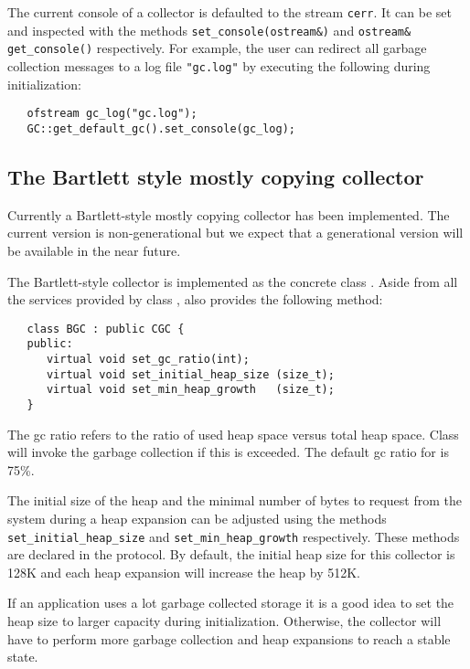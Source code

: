    The current console of a collector is defaulted to the \Cpp{} stream
\verb|cerr|.  It can be set and inspected with the methods
\verb|set_console(ostream&)| and \verb|ostream& get_console()| respectively.
For example, the user can redirect all garbage collection messages
to a log file \verb|"gc.log"| by executing the following during initialization:

\begin{verbatim}
   ofstream gc_log("gc.log");
   GC::get_default_gc().set_console(gc_log); 
\end{verbatim}

\subsection{The Bartlett style mostly copying collector}

   Currently a Bartlett-style mostly copying collector has been implemented.
The current version is non-generational but we expect that a generational
version will be available in the near future.

   The Bartlett-style collector is implemented as the concrete class
.  Aside from all the services provided by class ,
 also provides the following method:

\begin{verbatim}
   class BGC : public CGC {
   public:
      virtual void set_gc_ratio(int);
      virtual void set_initial_heap_size (size_t);
      virtual void set_min_heap_growth   (size_t);
   }
\end{verbatim}

  The gc ratio refers to the ratio of used heap space versus
total heap space.  Class  will invoke the garbage collection
if this is exceeded.  The default gc ratio for  is 75\%.

  The initial size of the heap and the minimal number of bytes to 
request from the system during a heap expansion can be adjusted using 
the methods \verb|set_initial_heap_size| and \verb|set_min_heap_growth|
respectively.  These methods are declared in the 
protocol.   By default, the initial heap size for this collector
is 128K and each heap expansion will increase the heap by 512K. 

If an application uses a lot garbage collected storage it is a good
idea to set the heap size to larger capacity during initialization.
Otherwise, the collector will have to perform more garbage collection
and heap expansions to reach a stable state. 


